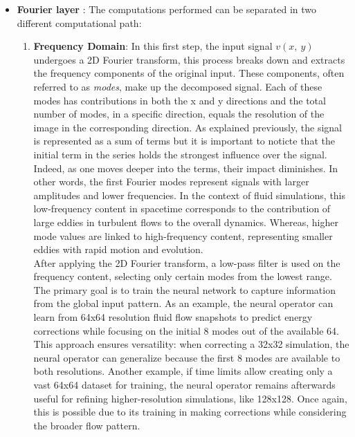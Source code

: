 \begin{itemize}
\newpage

	\item \textbf{Fourier layer} : The computations performed can be separated in two different computational path:
	
	\begin{enumerate}
		\item \textbf{Frequency Domain}: In this first step, the input signal $v(x, \ y)$ undergoes a 2D Fourier transform, this process breaks down and extracts the frequency components of the original input. These components, often referred to as \textit{modes}, make up the decomposed signal. Each of these modes has contributions in both the x and y directions and the total number of modes, in a specific direction, equals the resolution of the image in the corresponding direction. As explained previously, the signal is represented as a sum of terms but it is important to noticte that the initial term in the series holds the strongest influence over the signal. Indeed, as one moves deeper into the terms, their impact diminishes. In other words, the first Fourier modes represent signals with larger amplitudes and lower frequencies. In the context of fluid simulations, this low-frequency content in spacetime corresponds to the contribution of large eddies in turbulent flows to the overall dynamics. Whereas, higher mode values are linked to high-frequency content, representing smaller eddies with rapid motion and evolution.\\
		
After applying the 2D Fourier transform, a low-pass filter is used on the frequency content, selecting only certain modes from the lowest range. The primary goal is to train the neural network to capture information from the global input pattern. As an example, the neural operator can learn from 64x64 resolution fluid flow snapshots to predict energy corrections while focusing on the initial 8 modes out of the available 64. This approach ensures versatility: when correcting a 32x32 simulation, the neural operator can generalize because the first 8 modes are available to both resolutions. Another example, if time limits allow creating only a vast 64x64 dataset for training, the neural operator remains afterwards useful for refining higher-resolution simulations, like 128x128. Once again, this is possible due to its training in making corrections while considering the broader flow pattern.\\


\end{enumerate}
\end{itemize}
